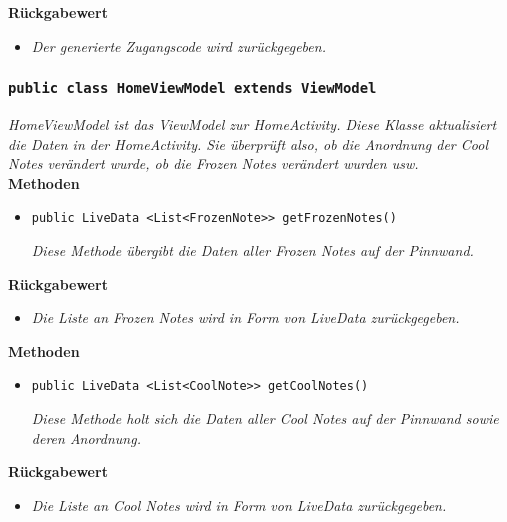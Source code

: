         \textbf{Rückgabewert}
        	\begin{itemize}
        		\item\textit{Der generierte Zugangscode wird zurückgegeben.}
        	\end{itemize}
       		 
             
             
            		\subsubsection{\texttt{public class HomeViewModel extends ViewModel}}
        \textit{HomeViewModel ist das ViewModel zur HomeActivity. Diese Klasse aktualisiert die Daten in der HomeActivity. Sie überprüft also, ob die Anordnung der Cool Notes verändert wurde, ob die Frozen Notes verändert wurden usw.}\\   
        
		\textbf{Methoden}
 			\begin{itemize}
        		\item{\texttt{public LiveData <List<FrozenNote>> getFrozenNotes()}}
        	
        		\textit{Diese Methode übergibt die Daten aller Frozen Notes auf der Pinnwand.}
        		
        	\end{itemize}
        
        		\textbf{Rückgabewert}
        		\begin{itemize}
        			\item\textit{Die Liste an Frozen Notes wird in Form von LiveData zurückgegeben.}
        		\end{itemize}
        	
        	\textbf{Methoden}
        	\begin{itemize}
        		\item{\texttt{public LiveData <List<CoolNote>> getCoolNotes()}}

        		\textit{Diese Methode holt sich die Daten aller Cool Notes auf der Pinnwand sowie deren Anordnung.}
        		
        	\end{itemize}
        
        	\textbf{Rückgabewert}
        	\begin{itemize}
        		\item\textit{Die Liste an Cool Notes wird in Form von LiveData zurückgegeben.}
			\end{itemize}	
		
